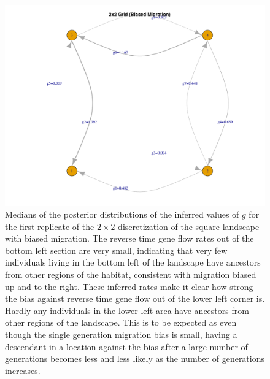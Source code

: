 \documentclass{article}
\begin{document}
\begin{figure}
\centering
 \includegraphics[scale=.5]{figs/2x2grid_asb}
\caption{
    Medians of the posterior distributions of the inferred values of $g$ 
    for the first replicate of the $2 \times 2$ discretization of the square landscape with biased migration.
    The reverse time gene flow rates out of the bottom left section are very small,
    indicating that very few individuals living in the bottom left of the landscape
    have ancestors from other regions of the habitat,
    consistent with migration biased up and to the right.
    These inferred rates make it clear how strong the bias 
    against reverse time gene flow out of the lower left corner is.
    Hardly any individuals in the lower left area have ancestors
    from other regions of the landscape.
    This is to be expected as even though the single generation migration bias is small,
    having a descendant in a location against the bias after a large number of generations
    becomes less and less likely as the number of generations increases.
    \label{fig:2x2grid_asb}
    }
\end{figure}
\end{document}
